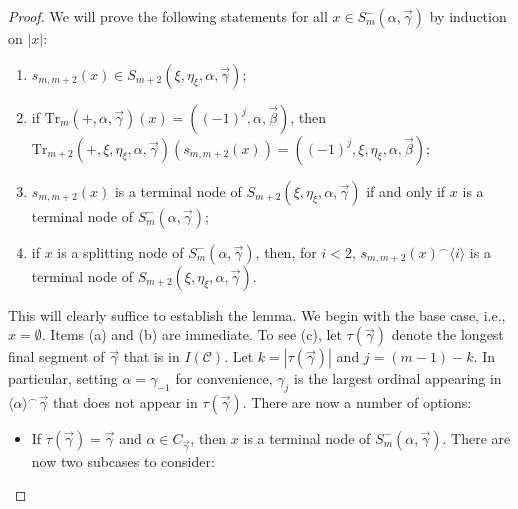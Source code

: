\documentclass{amsart}
\numberwithin{theorem}{section}
\theoremstyle{definition}
\newcommand{\nacc}{\mathrm{nacc}}
\newcommand{\acc}{\mathrm{acc}}
\newcommand{\mc}{\mathcal}
\begin{document}
\begin{proof}
  We will prove the following statements for all $x \in S^-_m(\alpha,\vec{\gamma})$ 
  by induction on $|x|$:
  \begin{enumerate}[label = (\alph*)]
    \item $s_{m,m+2}(x) \in S_{m+2}(\xi,\eta_\xi,\alpha,\vec{\gamma})$;
    \item if $\mathrm{Tr}_m(+,\alpha,\vec{\gamma})(x) = 
    ((-1)^j,\alpha,\vec{\beta})$, then 
    $\mathrm{Tr}_{m+2}(+,\xi,\eta_\xi,\alpha,\vec{\gamma})(s_{m,m+2}(x)) = 
    ((-1)^j,\xi,\eta_\xi,\alpha,\vec{\beta})$;
    \item $s_{m,m+2}(x)$ is a terminal node of $S_{m+2}(\xi,\eta_\xi,\alpha, 
    \vec{\gamma})$ if and only if $x$ is a terminal node of 
    $S^-_m(\alpha,\vec{\gamma})$;
    \item if $x$ is a splitting node of $S^-_m(\alpha,\vec{\gamma})$, then, for $i < 2$, 
    $s_{m,m+2}(x)^\smallfrown \langle i \rangle$ is a terminal node of 
    $S_{m+2}(\xi,\eta_\xi,\alpha,\vec{\gamma})$.
  \end{enumerate}
  This will clearly suffice to establish the lemma.
  We begin with the base case, i.e., $x = \emptyset$. Items (a) and (b) are 
  immediate. To see (c), let $\tau(\vec{\gamma})$ denote the longest final segment 
  of $\vec{\gamma}$ that is in $I(\mc{C})$. Let 
  $k = |\tau(\vec{\gamma})|$ and $j = (m-1)-k$. In particular, setting 
  $\alpha = \gamma_{-1}$ for convenience, $\gamma_j$ is the largest ordinal appearing 
  in $\langle \alpha \rangle^\smallfrown \vec{\gamma}$ that does not appear in 
  $\tau(\vec{\gamma})$. There are now a number of options:
  \begin{itemize}
    \item If $\tau(\vec{\gamma}) = \vec{\gamma}$ and $\alpha \in C_{\vec{\gamma}}$, 
    then $x$ is a terminal node of $S^-_m(\alpha,\vec{\gamma})$. There are now two 
    subcases to consider:
\end{itemize}
\end{proof}
\end{document}
